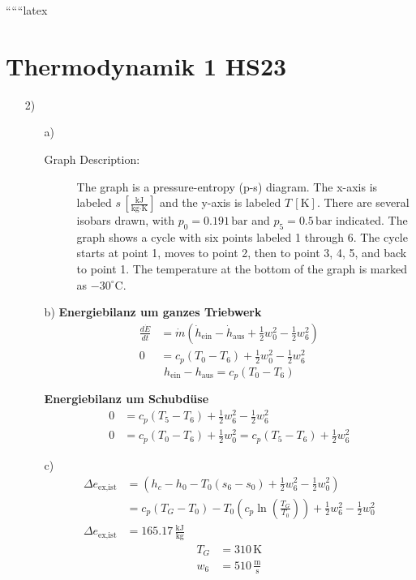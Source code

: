 
``````latex


\section*{Thermodynamik 1 HS23}

\begin{enumerate}
    \item[2)] 
    \begin{enumerate}
        \item[a)] 
        \begin{description}
            \item[Graph Description:] The graph is a pressure-entropy (p-s) diagram. The x-axis is labeled $s \, [\frac{\text{kJ}}{\text{kg} \cdot \text{K}}]$ and the y-axis is labeled $T \, [\text{K}]$. There are several isobars drawn, with $p_0 = 0.191 \, \text{bar}$ and $p_5 = 0.5 \, \text{bar}$ indicated. The graph shows a cycle with six points labeled 1 through 6. The cycle starts at point 1, moves to point 2, then to point 3, 4, 5, and back to point 1. The temperature at the bottom of the graph is marked as $-30^\circ \text{C}$.
        \end{description}
        
        \item[b)] \textbf{Energiebilanz um ganzes Triebwerk}
        \begin{align*}
            \frac{d\dot{E}}{dt} &= \dot{m} (\dot{h}_{\text{ein}} - \dot{h}_{\text{aus}} + \frac{1}{2} w_{0}^2 - \frac{1}{2} w_{6}^2) \\
            0 &= c_p (T_0 - T_6) + \frac{1}{2} w_{0}^2 - \frac{1}{2} w_{6}^2
        \end{align*}
        \begin{equation*}
            h_{\text{ein}} - h_{\text{aus}} = c_p (T_0 - T_6)
        \end{equation*}
        
        \textbf{Energiebilanz um Schubdüse}
        \begin{align*}
            0 &= c_p (T_5 - T_6) + \frac{1}{2} w_{6}^2 - \frac{1}{2} w_{6}^2 \\
            0 &= c_p (T_0 - T_6) + \frac{1}{2} w_{0}^2 = c_p (T_5 - T_6) + \frac{1}{2} w_{6}^2
        \end{align*}
        
        \item[c)] 
        \begin{align*}
            \Delta e_{\text{ex,ist}} &= (h_c - h_0 - T_0 (s_6 - s_0) + \frac{1}{2} w_{6}^2 - \frac{1}{2} w_{0}^2) \\
            &= c_p (T_G - T_0) - T_0 \left( c_p \ln \left( \frac{T_G}{T_0} \right) \right) + \frac{1}{2} w_{6}^2 - \frac{1}{2} w_{0}^2 \\
            \Delta e_{\text{ex,ist}} &= 165.17 \, \frac{\text{kJ}}{\text{kg}}
        \end{align*}
        \begin{align*}
            T_G &= 310 \, \text{K} \\
            w_{6} &= 510 \, \frac{\text{m}}{\text{s}}
        \end{align*}
        

\end{enumerate}
\end{enumerate}
